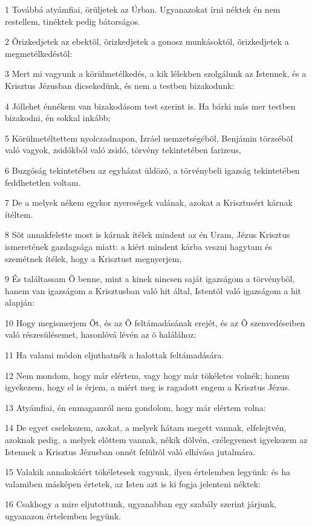 \par 1 Továbbá atyámfiai, örüljetek az Úrban. Ugyanazokat írni néktek én nem restellem, tinéktek pedig bátorságos.
\par 2 Õrizkedjetek az ebektõl, õrizkedjetek a gonosz munkásoktól, õrizkedjetek a megmetélkedéstõl:
\par 3 Mert mi vagyunk a körülmetélkedés, a kik lélekben szolgálunk az Istennek, és a Krisztus Jézusban dicsekedünk, és nem a testben bizakodunk:
\par 4 Jóllehet énnékem van bizakodásom test szerint is. Ha bárki más mer testben bizakodni, én sokkal inkább;
\par 5 Körülmetéltettem nyolczadnapon, Izráel nemzetségébõl, Benjámin törzsébõl való vagyok, zsidókból való zsidó, törvény tekintetében farizeus,
\par 6 Buzgóság tekintetében az egyházat üldözõ, a törvénybeli igazság tekintetében feddhetetlen voltam.
\par 7 De a melyek nékem egykor nyereségek valának, azokat a Krisztusért kárnak ítéltem.
\par 8 Sõt annakfelette most is kárnak ítélek mindent az én Uram, Jézus Krisztus ismeretének gazdagsága miatt: a kiért mindent kárba veszni hagytam és szemétnek ítélek, hogy a Krisztust megnyerjem,
\par 9 És találtassam Õ benne, mint a kinek nincsen saját igazságom a törvénybõl, hanem van igazságom a Krisztusban való hit által, Istentõl való igazságom a hit alapján:
\par 10 Hogy megismerjem Õt, és az Õ feltámadásának erejét, és az Õ szenvedéseiben való részesülésemet, hasonlóvá lévén az õ halálához;
\par 11 Ha valami módon eljuthatnék a halottak feltámadására.
\par 12 Nem mondom, hogy már elértem, vagy hogy már tökéletes volnék; hanem igyekezem, hogy el is érjem, a miért meg is ragadott engem a Krisztus Jézus.
\par 13 Atyámfiai, én enmagamról nem gondolom, hogy már elértem volna:
\par 14 De egyet cselekszem, azokat, a melyek hátam megett vannak, elfelejtvén, azoknak pedig, a melyek elõttem vannak, nékik dõlvén, czélegyenest igyekszem az Istennek a Krisztus Jézusban onnét felülrõl való elhívása jutalmára.
\par 15 Valakik annakokáért tökéletesek vagyunk, ilyen értelemben legyünk: és ha valamiben másképen értetek, az Isten azt is ki fogja jelenteni néktek:
\par 16 Csakhogy a mire eljutottunk, ugyanabban egy szabály szerint járjunk, ugyanazon értelemben legyünk.
